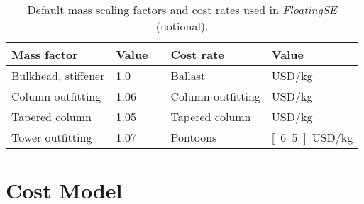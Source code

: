 \begin{table}[htbp]
  \begin{center}
    {\small
      \caption{Default mass scaling factors and cost rates used in
        \textit{FloatingSE} (notional).}
      \label{tbl:factors}
      \begin{tabular}{llcll}
        \textbf{Mass factor} & \textbf{Value} && \textbf{Cost rate} & \textbf{Value} \\
        \hline \hline
        Bulkhead, stiffener & 1.0 && Ballast & \unit[100]{USD/kg} \\
        Column outfitting & 1.06 && Column outfitting & \unit[6,980]{USD/kg} \\
        Tapered column & 1.05 && Tapered column & \unit[4,720]{USD/kg} \\
        Tower outfitting & 1.07 && Pontoons & \unit[6.5]{USD/kg} \\
        \hline
      \end{tabular}
    }
  \end{center}
\end{table}


\section{Cost Model}

